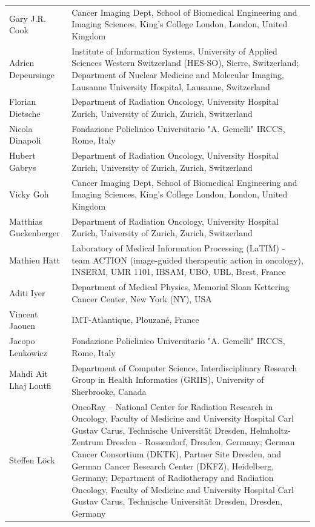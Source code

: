 \documentclass[fleqn,a4paper,oneside,openany]{book}
\begin{document}
\begin{longtable}{p{4cm}p{10cm}}
Gary J.R. Cook
& Cancer Imaging Dept, School of Biomedical Engineering and Imaging Sciences, King’s College London, London, United Kingdom\\ 
Adrien Depeursinge
& Institute of Information Systems, University of Applied Sciences Western Switzerland (HES-SO), Sierre, Switzerland; Department of Nuclear Medicine and Molecular Imaging, Lausanne University Hospital, Lausanne, Switzerland\\ 
Florian Dietsche
& Department of Radiation Oncology, University Hospital Zurich, University of Zurich, Zurich, Switzerland\\ 
Nicola Dinapoli
& Fondazione Policlinico Universitario "A. Gemelli" IRCCS, Rome, Italy\\ 
Hubert Gabrys
& Department of Radiation Oncology, University Hospital Zurich, University of Zurich, Zurich, Switzerland\\ 
Vicky Goh
& Cancer Imaging Dept, School of Biomedical Engineering and Imaging Sciences, King’s College London, London, United Kingdom\\ 
Matthias Guckenberger
& Department of Radiation Oncology, University Hospital Zurich, University of Zurich, Zurich, Switzerland\\ 
Mathieu Hatt
& Laboratory of Medical Information Processing (LaTIM) - team ACTION (image-guided therapeutic action in oncology), INSERM, UMR 1101, IBSAM, UBO, UBL, Brest, France\\ 
Aditi Iyer
& Department of Medical Physics, Memorial Sloan Kettering Cancer Center, New York (NY), USA\\ 
Vincent Jaouen
& IMT-Atlantique, Plouzané, France\\ 
Jacopo Lenkowicz
& Fondazione Policlinico Universitario "A. Gemelli" IRCCS, Rome, Italy\\ 
Mahdi Ait Lhaj Loutfi & Department of Computer Science, Interdisciplinary Research Group in Health Informatics (GRIIS), University of Sherbrooke, Canada\\
Steffen L{\"o}ck
& OncoRay – National Center for Radiation Research in Oncology, Faculty of Medicine and University Hospital Carl Gustav Carus, Technische Universität Dresden, Helmholtz-Zentrum Dresden - Rossendorf, Dresden, Germany; German Cancer Consortium (DKTK), Partner Site Dresden, and German Cancer Research Center (DKFZ), Heidelberg, Germany; Department of Radiotherapy and Radiation Oncology, Faculty of Medicine and University Hospital Carl Gustav Carus, Technische Universität Dresden, Dresden, Germany\\ 

\end{longtable}
\end{document}
